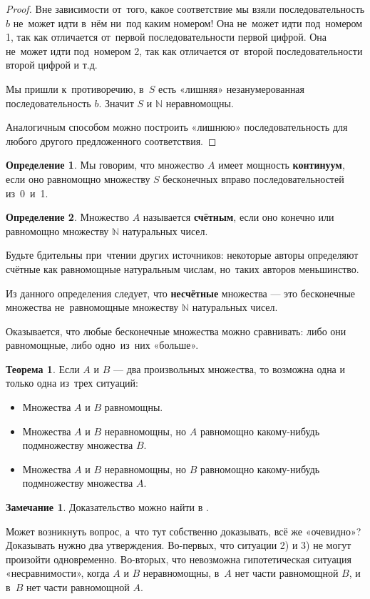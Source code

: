 \documentclass[pdftex, 12pt, a4paper]{article}
\def \mbb{\mathbb}
\def \N{\mbb N}
\theoremstyle{definition} %
\newtheorem*{mydef}{Определение}
\newtheorem*{rem}{Замечание}
\newtheorem{myth}{Теорема}
\numberwithin{problem}{section}
\newcommand{\indef}[1]{\textbf{#1}}
\numberwithin{blits}{section}
\begin{document}
\begin{proof}
Вне зависимости от~того, какое соответствие мы взяли  последовательность $b$ не~может идти в~нём ни~под каким номером! Она не~может идти под~номером 1, так как отличается от~первой последовательности первой цифрой. Она не~может идти под~номером 2, так как отличается от~второй последовательности второй цифрой и т.д.

Мы пришли к~противоречию, в~$S$ есть «лишняя» незанумерованная последовательность $b$. Значит $S$ и $\N$ неравномощны.


Аналогичным способом можно построить «лишнюю» последовательность для любого другого предложенного соответствия.
\end{proof}

\begin{mydef} Мы говорим, что множество $A$ имеет мощность \indef{континуум},  если оно равномощно множеству $S$ бесконечных вправо последовательностей из~0~и~1.
\end{mydef}
\begin{mydef} Множество $A$ называется \indef{счётным},  если оно конечно или равномощно множеству $\N$ натуральных чисел.
\end{mydef}
Будьте бдительны при~чтении других источников: некоторые авторы определяют счётные как равномощные натуральным числам, но~таких авторов меньшинство.

Из данного определения следует, что \indef{несчётные}  множества --- это бесконечные множества не~равномощные множеству $\N$ натуральных чисел.

Оказывается, что любые бесконечные множества можно сравнивать: либо они равномощные, либо одно~из~них «больше».

\begin{myth} Если $A$ и $B$ --- два произвольных множества, то возможна одна и только одна из~трех ситуаций:
\begin{itemize}
\item[1.] Множества $A$ и $B$ равномощны.
\item[2.] Множества $A$ и $B$ неравномощны, но $A$ равномощно какому-нибудь подмножеству множества $B$.
\item[3.] Множества $A$ и $B$ неравномощны, но $B$ равномощно какому-нибудь подмножеству множества $A$.
\end{itemize}
\end{myth}

\begin{rem} Доказательство можно найти в \cite{Shan:sets}.

Может возникнуть вопрос, а~что тут собственно доказывать, всё же «очевидно»? Доказывать нужно два утверждения. Во-первых, что ситуации 2) и 3) не могут произойти одновременно. Во-вторых, что невозможна гипотетическая ситуация «несравнимости», когда $A$ и $B$ неравномощны, в~$A$ нет части равномощной $B$, и в~$B$ нет части равномощной $A$.
\end{rem}
\end{document}
